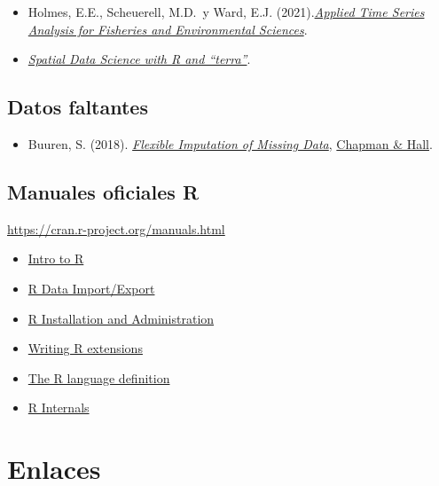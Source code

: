 \documentclass[
]{book}
\providecommand{\tightlist}{%
  \setlength{\itemsep}{0pt}\setlength{\parskip}{0pt}}
\theoremstyle{break}
\theoremstyle{nonumberplain}
\begin{document}
\begin{itemize}
\item
  Holmes, E.E., Scheuerell, M.D.~y Ward, E.J. (2021).\emph{\href{https://atsa-es.github.io/atsa-labs/}{Applied Time Series Analysis for Fisheries and Environmental Sciences}}.
\item
  \emph{\href{https://rspatial.org/}{Spatial Data Science with R and ``terra''}}.
\end{itemize}

\subsection*{Datos faltantes}\label{datos-faltantes}

\begin{itemize}
\tightlist
\item
  Buuren, S. (2018). \emph{\href{https://stefvanbuuren.name/fimd}{Flexible Imputation of Missing Data}}, \href{}{Chapman \& Hall}.
\end{itemize}

\subsection*{Manuales oficiales R}\label{manuales-oficiales-r}

\url{https://cran.r-project.org/manuals.html}

\begin{itemize}
\item
  \href{http://colinfay.me/intro-to-r/}{Intro to R}
\item
  \href{http://colinfay.me/r-data-import-export/}{R Data Import/Export}
\item
  \href{http://colinfay.me/r-installation-administration/}{R Installation and Administration}
\item
  \href{http://colinfay.me/writing-r-extensions/}{Writing R extensions}
\item
  \href{http://colinfay.me/r-language-definition/}{The R language definition}
\item
  \href{http://colinfay.me/r-internals/}{R Internals}
\end{itemize}

\section*{Enlaces}\label{links}
\end{document}

